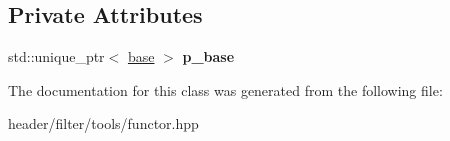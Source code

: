 \subsection*{Private Attributes}
\begin{DoxyCompactItemize}
\item 
\mbox{\label{classdt_functor_a48539a2d735d52557d89c00f3623bfb7}} 
std\+::unique\+\_\+ptr$<$ \hyperlink{structdt_functor_1_1base}{base} $>$ {\bfseries p\+\_\+base}
\end{DoxyCompactItemize}


The documentation for this class was generated from the following file\+:\begin{DoxyCompactItemize}
\item 
header/filter/tools/functor.\+hpp\end{DoxyCompactItemize}
